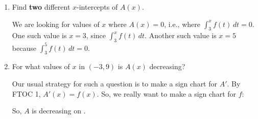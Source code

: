 \documentclass{article}
\begin{document}
\begin{enumerate}
\begin{enumerate}
    \begin{solution}
      This is $\displaystyle \int_{3}^2 f(t)\,dt$, which equals
      $\displaystyle -\int_{2}^3 f(t)\,dt$. $\displaystyle \int_{2}^3
      f(t)\,dt$ is the area under the curve between $x=2$ and $x=3$.  This
      forms a trapezoid, and we can compute its area as 15.  Thus, the
      answer is $\boxed{-15}$.
    \end{solution}

  \item

    \begin{problem}[\vfill]
      Find \textbf{two} different $x$-intercepts of $A(x)$. 
    \end{problem}

    \begin{solution}
      We are looking for values of $x$ where $A(x) = 0$, i.e., where
      $\displaystyle \int_3^x f(t)\,dt = 0$.  One such value is $x =
      \boxed{3}$, since $\displaystyle \int_3^x f(t)\,dt$.  Another such
      value is $x = \boxed{5}$ because $\displaystyle \int_3^5 f(t)\,dt =
      0$.
    \end{solution}

  \item \label{spring2012-mb-midterm2-area-function-c}
    \begin{problem}[\vfill]
      For what values of $x$ in $(-3, 9)$ is $ A(x)$ decreasing? 
    \end{problem}

    \begin{solution}
      Our usual strategy for such a question is to make a sign chart for
      $ A'$.  By FTOC 1, $ A'(x) = f(x)$.  So, we really want
      to make a sign chart for $f$:
      \begin{center}
      \end{center}
      So, $ A$ is decreasing on .
    \end{solution}


\end{enumerate}
\end{enumerate}
\end{document}
